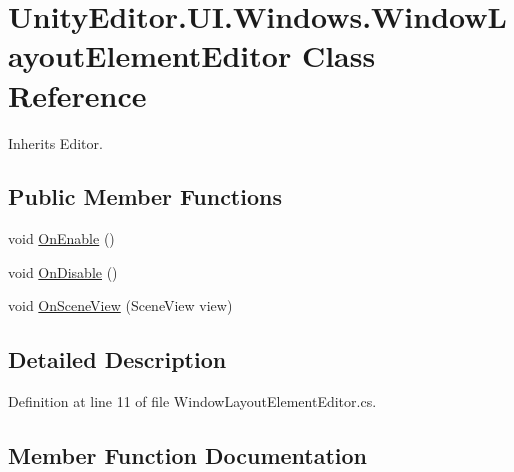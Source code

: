 \hypertarget{class_unity_editor_1_1_u_i_1_1_windows_1_1_window_layout_element_editor}{}\section{Unity\+Editor.\+U\+I.\+Windows.\+Window\+Layout\+Element\+Editor Class Reference}
\label{class_unity_editor_1_1_u_i_1_1_windows_1_1_window_layout_element_editor}


Inherits Editor.

\subsection*{Public Member Functions}
\begin{DoxyCompactItemize}
\item 
void \hyperlink{class_unity_editor_1_1_u_i_1_1_windows_1_1_window_layout_element_editor_a660fe9d84feab3530944dac616626cf8}{On\+Enable} ()
\item 
void \hyperlink{class_unity_editor_1_1_u_i_1_1_windows_1_1_window_layout_element_editor_a26cdd78e0db1b2f08420677463bece0c}{On\+Disable} ()
\item 
void \hyperlink{class_unity_editor_1_1_u_i_1_1_windows_1_1_window_layout_element_editor_a879884d837fbcb39757e6b77b6155e09}{On\+Scene\+View} (Scene\+View view)
\end{DoxyCompactItemize}


\subsection{Detailed Description}


Definition at line 11 of file Window\+Layout\+Element\+Editor.\+cs.



\subsection{Member Function Documentation}
\hypertarget{class_unity_editor_1_1_u_i_1_1_windows_1_1_window_layout_element_editor_a26cdd78e0db1b2f08420677463bece0c}{}
